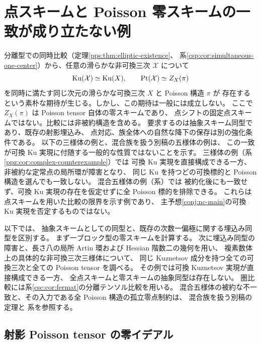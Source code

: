 \section{点スキームと Poisson 零スキームの一致が成り立たない例}
\label{ppz:sec:comparison}

\begin{remark}[点スキームと零スキームの一致という素朴な期待]
\label{ppz:rem:naive-expectation}
分離型での同時比較（定理\ref{pps:thm:elliptic-existence}、
系\ref{csp:cor:simultaneous-one-center}）から、任意の滑らかな非可換三次
$\mathcal X$ について
\[
 \operatorname{Ku}(\mathcal X)\simeq\operatorname{Ku}(X),\qquad
 \operatorname{Pt}(\mathcal X)\simeq Z_X(\pi)
\]
を同時に満たす同じ次元の滑らかな可換三次 $X$ と Poisson 構造 $\pi$ が
存在するという素朴な期待が生じる。しかし、この期待は一般には成立しない。
ここで $Z_X(\pi)$ は Poisson tensor 自体の零スキームであり、
点シフトの固定点スキームではない。比較には非被約構造を含める。
要求するのは抽象スキーム同型であり、既存の射影埋込み、
点対応、族全体への自然な降下の保存は別の強化条件である。
以下の三様体の例と、混合族を扱う別稿の五様体の例は、
この一致が可換 Ku 実現に付随する一般的な性質ではないことを示す。
三様体の例（系\ref{ppz:cor:complex-counterexample}）では
可換 Ku 実現を直接構成できる一方、非被約な定常点の局所環が障害となり、
同じ Ku を持つどの可換標的と Poisson 構造を選んでも一致しない。
混合五様体の例（系）では
被約化後にも一致せず、可換 Ku 実現の存在を仮定せずに全 Poisson 標的を排除できる。
これらは点スキームを用いた比較の限界を示す例であり、
主予想\ref{conj:nc-main}の可換 Ku 実現を否定するものではない。
\end{remark}

以下では、
抽象スキームとしての同型と、既存の次数一偏極に関する埋込み同型を区別する。
まず一ブロック型の零スキームを計算する。
次に埋込み同型の障害と、長さ八の局所 Artin 環および Hessian 階数二の幾何を用い、
複素数体上の具体的な非可換三次三様体について、
同じ Kuznetsov 成分を持つ全ての可換三次と全ての Poisson tensor を調べる。
その例では可換 Kuznetsov 実現が直接構成できる一方、
全点スキームと零スキームの抽象同型は存在しない。
圏比較には系\ref{csc:cor:fermat}の分離テンソル比較を用いる。
混合五様体の被約な不一致と、その入力である全 Poisson 構造の孤立零点制約は、
混合族を扱う別稿の定理と
系を参照する。

\subsection{射影 Poisson tensor の零イデアル}

